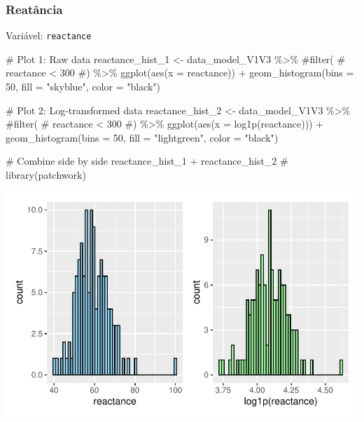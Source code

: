 \documentclass[
  12pt,
]{article}
\newenvironment{Shaded}{\begin{snugshade}}{\end{snugshade}}
\newcommand{\AttributeTok}[1]{\textcolor[rgb]{0.40,0.45,0.13}{#1}}
\newcommand{\CommentTok}[1]{\textcolor[rgb]{0.37,0.37,0.37}{#1}}
\newcommand{\DecValTok}[1]{\textcolor[rgb]{0.68,0.00,0.00}{#1}}
\newcommand{\FunctionTok}[1]{\textcolor[rgb]{0.28,0.35,0.67}{#1}}
\newcommand{\NormalTok}[1]{\textcolor[rgb]{0.00,0.23,0.31}{#1}}
\newcommand{\OtherTok}[1]{\textcolor[rgb]{0.00,0.23,0.31}{#1}}
\newcommand{\SpecialCharTok}[1]{\textcolor[rgb]{0.37,0.37,0.37}{#1}}
\newcommand{\StringTok}[1]{\textcolor[rgb]{0.13,0.47,0.30}{#1}}
\begin{document}
\subsubsection{Reatância}\label{reatuxe2ncia}

Variável: \texttt{reactance}

\begin{Shaded}
\begin{Highlighting}[]
\CommentTok{\# Plot 1: Raw data}
\NormalTok{reactance\_hist\_1 }\OtherTok{\textless{}{-}}\NormalTok{ data\_model\_V1V3 }\SpecialCharTok{\%\textgreater{}\%} 
    \CommentTok{\#filter(}
    \CommentTok{\#    reactance \textless{} 300}
    \CommentTok{\#) \%\textgreater{}\% }
    \FunctionTok{ggplot}\NormalTok{(}\FunctionTok{aes}\NormalTok{(}\AttributeTok{x =}\NormalTok{ reactance)) }\SpecialCharTok{+} 
    \FunctionTok{geom\_histogram}\NormalTok{(}\AttributeTok{bins =} \DecValTok{50}\NormalTok{, }\AttributeTok{fill =} \StringTok{"skyblue"}\NormalTok{, }\AttributeTok{color =} \StringTok{"black"}\NormalTok{)}

\CommentTok{\# Plot 2: Log{-}transformed data}
\NormalTok{reactance\_hist\_2 }\OtherTok{\textless{}{-}}\NormalTok{ data\_model\_V1V3 }\SpecialCharTok{\%\textgreater{}\%} 
    \CommentTok{\#filter(}
    \CommentTok{\#    reactance \textless{} 300}
    \CommentTok{\#) \%\textgreater{}\%}
    \FunctionTok{ggplot}\NormalTok{(}\FunctionTok{aes}\NormalTok{(}\AttributeTok{x =} \FunctionTok{log1p}\NormalTok{(reactance))) }\SpecialCharTok{+} 
    \FunctionTok{geom\_histogram}\NormalTok{(}\AttributeTok{bins =} \DecValTok{50}\NormalTok{, }\AttributeTok{fill =} \StringTok{"lightgreen"}\NormalTok{, }\AttributeTok{color =} \StringTok{"black"}\NormalTok{)}

\CommentTok{\# Combine side by side}
\NormalTok{reactance\_hist\_1 }\SpecialCharTok{+}\NormalTok{ reactance\_hist\_2 }\CommentTok{\# library(patchwork)}
\end{Highlighting}
\end{Shaded}

\includegraphics{Outcomes_files/figure-pdf/reactance_1-1.pdf}
\end{document}
